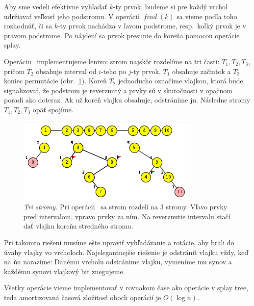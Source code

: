 
Aby sme vedeli efektívne vyhľadať $k$-ty prvok, budeme si pre každý vrchol udržiavať veľkosť jeho
podstromu. V operácií $\mathop{\mathit{find}}(k)$ sa vieme podľa toho rozhodnúť, či sa $k$-ty prvok nachádza v ľavom podstrome,
resp.~koľký prvok je v pravom podstrome. Po nájdení sa prvok presunie do koreňa pomocou operácie splay.

Operáciu \reverse\ implementujeme lenivo: 
strom najskôr rozdelíme na tri časti: $T_1,T_2,T_3$, pričom $T_2$ obsahuje interval od $i$-teho 
po $j$-ty prvok, $T_1$ obsahuje začiatok a $T_3$ koniec permutácie (obr.~\ref{img:rev2}). 
Koreň $T_2$ jednoducho označíme vlajkou, ktorá bude signalizovať, že podstrom je reverznutý a 
prvky sú v skutočnosti v opačnom poradí ako doteraz. Ak už koreň vlajku obsahuje, odstránime ju. 
Následne stromy $T_1,T_2,T_3$ opäť spojíme.


\begin{figure}
\includegraphics[width=\columnwidth]{obrazky/rev3trees.png}
\caption{\emph{Tri stromy.} Pri operácii \reverse\ sa strom rozdelí na 3 stromy. 
Vľavo prvky pred intervalom, vpravo prvky za ním. 
Na reverznutie intervalu stačí dať vlajku koreňu stredného stromu.}
\label{img:rev2}
\end{figure}

Pri takomto riešení musíme ešte upraviť vyhľadávanie a rotácie, aby brali do úvahy vlajky vo vrcholoch.
Najelegantnejšie riešenie je odstrániť vlajku vždy, keď na ňu narazíme:
Danému vrcholu odstránime vlajku, vymeníme mu synov a každému synovi vlajkový bit znegujeme.

Všetky operácie vieme implementovať v rovnakom čase ako operácie v splay tree, teda amortizovaná 
časová zložitosť oboch operácií je $O(\log n)$.

